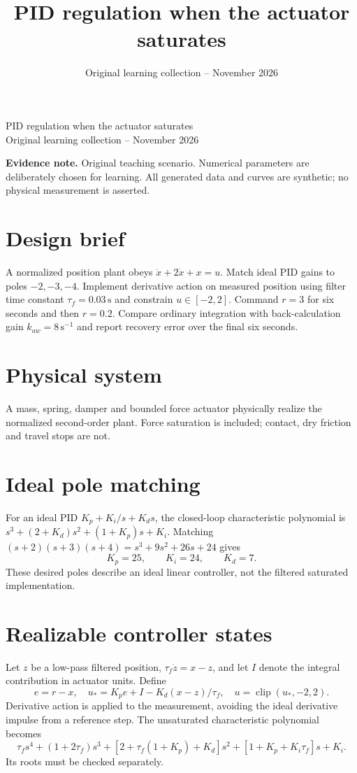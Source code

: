 \documentclass[10pt,a4paper]{article}
\title{\color{ink}PID regulation when the actuator saturates}
\author{}
\date{Original learning collection -- November 2026}
\begin{document}
\begin{center}{\LARGE\color{ink}PID regulation when the actuator saturates}\\[5pt]{\small Original learning collection -- November 2026}\end{center}

\textbf{Evidence note.} Original teaching scenario. Numerical parameters are deliberately chosen for learning. All generated data and curves are synthetic; no physical measurement is asserted.
\section{Design brief}
A normalized position plant obeys $\ddot x+2\dot x+x=u$. Match ideal PID gains to poles $-2,-3,-4$. Implement derivative action on measured position using filter time constant $\tau_f=0.03\,\mathrm{s}$ and constrain $u\in[-2,2]$. Command $r=3$ for six seconds and then $r=0.2$. Compare ordinary integration with back-calculation gain $k_{aw}=8\,\mathrm{s^{-1}}$ and report recovery error over the final six seconds.
\section{Physical system}
\begin{center}\resizebox{.88\linewidth}{!}{}\par{\small A mass, spring, damper and bounded force actuator physically realize the normalized second-order plant. Force saturation is included; contact, dry friction and travel stops are not.}\end{center}
\section{Ideal pole matching}
For an ideal PID $K_p+K_i/s+K_ds$, the closed-loop characteristic polynomial is $s^3+(2+K_d)s^2+(1+K_p)s+K_i$. Matching $(s+2)(s+3)(s+4)=s^3+9s^2+26s+24$ gives
\[K_p=25,\qquad K_i=24,\qquad K_d=7.\]
These desired poles describe an ideal linear controller, not the filtered saturated implementation.
\section{Realizable controller states}
Let $z$ be a low-pass filtered position, $\tau_f\dot z=x-z$, and let $I$ denote the integral contribution in actuator units. Define
\[e=r-x,\quad u_* = K_pe+I-K_d(x-z)/\tau_f,\quad u=\operatorname{clip}(u_*,-2,2).\]
Derivative action is applied to the measurement, avoiding the ideal derivative impulse from a reference step. The unsaturated characteristic polynomial becomes
\[\tau_fs^4+(1+2\tau_f)s^3+[2+\tau_f(1+K_p)+K_d]s^2+[1+K_p+K_i\tau_f]s+K_i.\]
Its roots must be checked separately.
\end{document}
